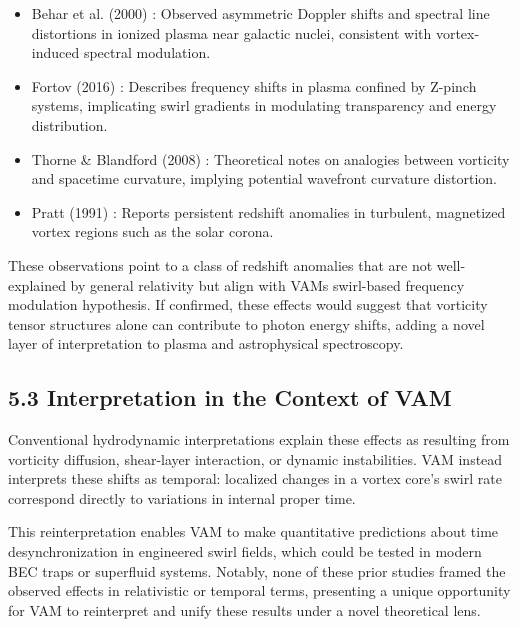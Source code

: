 \begin{itemize}

\item Behar et al. (2000) \cite{behar2000}: Observed asymmetric Doppler shifts and spectral line distortions in ionized plasma near galactic
nuclei, consistent with vortex-induced spectral modulation.

\item Fortov (2016) \cite{fortov2016}: Describes frequency shifts in plasma confined by Z-pinch systems, implicating swirl gradients in modulating
transparency and energy distribution.

\item Thorne & Blandford (2008) \cite{thorne2008}: Theoretical notes on analogies between vorticity and spacetime curvature, implying potential
wavefront curvature distortion.



\item Pratt (1991) \cite{pratt1991}: Reports persistent redshift anomalies in turbulent, magnetized vortex regions such as the solar corona.




\end{itemize}

These observations point to a class of redshift anomalies that are not well-explained by general relativity but align with VAM\rqs s swirl-based frequency modulation hypothesis. If confirmed, these effects would suggest that vorticity tensor structures alone can contribute to photon energy shifts, adding a novel layer of interpretation to plasma and astrophysical spectroscopy.


\subsection*{5.3 Interpretation in the Context of VAM}

Conventional hydrodynamic interpretations explain these effects as resulting from vorticity diffusion, shear-layer interaction, or dynamic instabilities. VAM instead interprets these shifts as temporal: localized changes in a vortex core's swirl rate correspond directly to variations in internal proper time.


This reinterpretation enables VAM to make quantitative predictions about time desynchronization in engineered swirl fields, which could be tested in modern BEC traps or superfluid systems. Notably, none of these prior studies framed the observed effects in relativistic or temporal terms, presenting a unique opportunity for VAM to reinterpret and unify these results under a novel theoretical lens.


